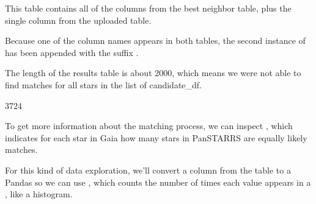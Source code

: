 \documentclass[letterpaper,10pt,english]{sphinxmanual}
\begin{document}
This table contains all of the columns from the best neighbor table, plus the single column from the uploaded table.

\begin{sphinxVerbatim}[commandchars=\\\{\}]
\end{sphinxVerbatim}

\begin{sphinxVerbatim}
\end{sphinxVerbatim}

Because one of the column names appears in both tables, the second instance of  has been appended with the suffix .

The length of the results table is about 2000, which means we were not able to find matches for all stars in the list of candidate\_df.

\begin{sphinxVerbatim}[commandchars=\\\{\}]
\end{sphinxVerbatim}

\begin{sphinxVerbatim}[commandchars=\\\{\}]
3724
\end{sphinxVerbatim}

To get more information about the matching process, we can inspect , which indicates for each star in Gaia how many stars in Pan\sphinxhyphen{}STARRS are equally likely matches.

For this kind of data exploration, we’ll convert a column from the table to a Pandas  so we can use , which counts the number of times each value appears in a , like a histogram.
\end{document}

